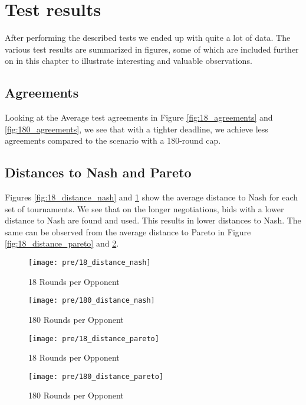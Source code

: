 \section{Test results}

After performing the described tests we ended up with quite a lot of data. The various test results are summarized in figures, some of which are included further on in this chapter to illustrate interesting and valuable observations.

\subsection{Agreements}

Looking at the Average test agreements in Figure \ref{fig:18_agreements} and \ref{fig:180_agreements}, we see that with a tighter deadline, we achieve less agreements compared to the scenario with a 180-round cap.

\subsection{Distances to Nash and Pareto}

Figures \ref{fig:18_distance_nash} and \ref{fig:180_distance_nash} show the average distance to Nash for each set of tournaments. We see that on the longer negotiations, bids with a lower distance to Nash are found and used. This results in lower distances to Nash. The same can be observed from the average distance to Pareto in Figure \ref{fig:18_distance_pareto} and \ref{fig:180_distance_pareto}.

\begin{figure}[H]
	\texttt{[image: pre/18\_distance\_nash]}
	\caption{18 Rounds per Opponent}
	\label{fig:18_distance_nash}
	\endminipage\hfill
	\texttt{[image: pre/180\_distance\_nash]}
	\caption{180 Rounds per Opponent}
	\label{fig:180_distance_nash}
	\endminipage\hfill
\end{figure}

\begin{figure}[H]
	\texttt{[image: pre/18\_distance\_pareto]}
	\caption{18 Rounds per Opponent}
	\label{fig:18_distance_pareto}
	\endminipage\hfill
	\texttt{[image: pre/180\_distance\_pareto]}
	\caption{180 Rounds per Opponent}
	\label{fig:180_distance_pareto}
	\endminipage\hfill
\end{figure}

